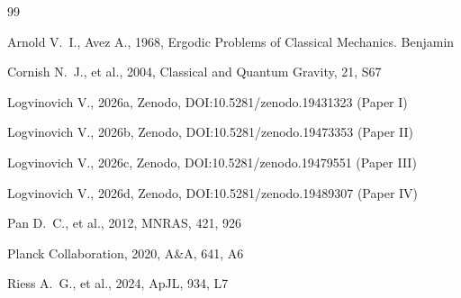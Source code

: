 \documentclass[12pt,a4paper]{report}
\begin{document}
\begin{thebibliography}{99}

Arnold V.~I., Avez A., 1968, Ergodic Problems of Classical Mechanics. Benjamin

Cornish N.~J., et al., 2004, Classical and Quantum Gravity, 21, S67

Logvinovich V., 2026a, Zenodo, DOI:10.5281/zenodo.19431323 (Paper I)

Logvinovich V., 2026b, Zenodo, DOI:10.5281/zenodo.19473353 (Paper II)

Logvinovich V., 2026c, Zenodo, DOI:10.5281/zenodo.19479551 (Paper III)

Logvinovich V., 2026d, Zenodo, DOI:10.5281/zenodo.19489307 (Paper IV)

Pan D.~C., et al., 2012, MNRAS, 421, 926

Planck Collaboration, 2020, A\&A, 641, A6

Riess A.~G., et al., 2024, ApJL, 934, L7

\end{thebibliography}
\end{document}
